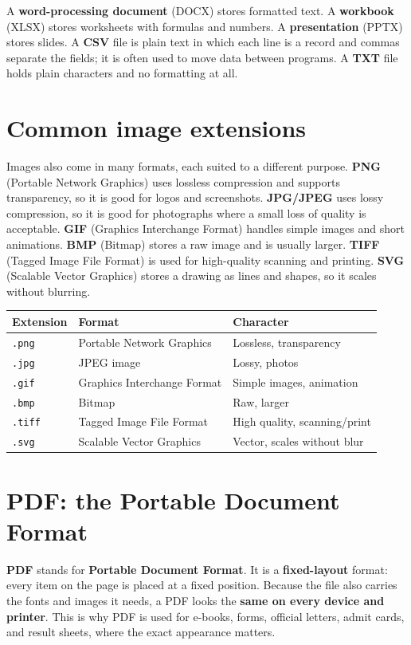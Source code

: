 \documentclass[11pt]{article}
\begin{document}
A \textbf{word-processing document} (DOCX) stores formatted text. A
\textbf{workbook} (XLSX) stores worksheets with formulas and numbers. A
\textbf{presentation} (PPTX) stores slides. A \textbf{CSV} file is plain text
in which each line is a record and commas separate the fields; it is often
used to move data between programs. A \textbf{TXT} file holds plain
characters and no formatting at all.

\section{Common image extensions}
Images also come in many formats, each suited to a different purpose.
\textbf{PNG} (Portable Network Graphics) uses lossless compression and
supports transparency, so it is good for logos and screenshots.
\textbf{JPG/JPEG} uses lossy compression, so it is good for photographs where
a small loss of quality is acceptable. \textbf{GIF} (Graphics Interchange
Format) handles simple images and short animations. \textbf{BMP} (Bitmap)
stores a raw image and is usually larger. \textbf{TIFF} (Tagged Image File
Format) is used for high-quality scanning and printing. \textbf{SVG}
(Scalable Vector Graphics) stores a drawing as lines and shapes, so it scales
without blurring.

\begin{center}
\begin{tabular}{p{}p{}p{}}
\toprule
\textbf{Extension} & \textbf{Format} & \textbf{Character} \\
\midrule
\texttt{.png} & Portable Network Graphics & Lossless, transparency \\
\texttt{.jpg} & JPEG image & Lossy, photos \\
\texttt{.gif} & Graphics Interchange Format & Simple images, animation \\
\texttt{.bmp} & Bitmap & Raw, larger \\
\texttt{.tiff} & Tagged Image File Format & High quality, scanning/print \\
\texttt{.svg} & Scalable Vector Graphics & Vector, scales without blur \\
\bottomrule
\end{tabular}
\end{center}

\section{PDF: the Portable Document Format}
\textbf{PDF} stands for \textbf{Portable Document Format}. It is a
\textbf{fixed-layout} format: every item on the page is placed at a fixed
position. Because the file also carries the fonts and images it needs, a PDF
looks the \textbf{same on every device and printer}. This is why PDF is used
for e-books, forms, official letters, admit cards, and result sheets, where
the exact appearance matters.
\end{document}
